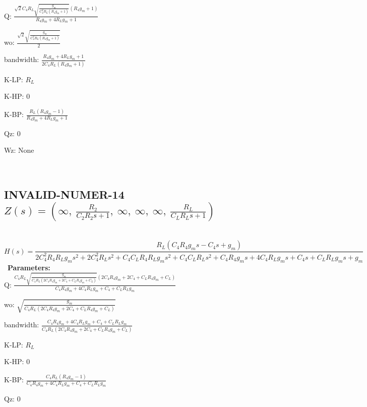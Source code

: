 \documentclass{article}
\begin{document}
Q: $\frac{\sqrt{2} C_{4} R_{L} \sqrt{\frac{g_{m}}{C_{4}^{2} R_{L} \left(R_{4} g_{m} + 1\right)}} \left(R_{4} g_{m} + 1\right)}{R_{4} g_{m} + 4 R_{L} g_{m} + 1}$\ 

wo: $\frac{\sqrt{2} \sqrt{\frac{g_{m}}{C_{4}^{2} R_{L} \left(R_{4} g_{m} + 1\right)}}}{2}$\ 

bandwidth: $\frac{R_{4} g_{m} + 4 R_{L} g_{m} + 1}{2 C_{4} R_{L} \left(R_{4} g_{m} + 1\right)}$\ 

K-LP: $R_{L}$\ 

K-HP: $0$\ 

K-BP: $\frac{R_{L} \left(R_{4} g_{m} - 1\right)}{R_{4} g_{m} + 4 R_{L} g_{m} + 1}$\ 

Qz: $0$\ 

Wz: $\text{None}$\ 

\ 

\subsection{INVALID-NUMER-14 $Z(s) = \left( \infty, \  \frac{R_{2}}{C_{2} R_{2} s + 1}, \  \infty, \  \infty, \  \infty, \  \frac{R_{L}}{C_{L} R_{L} s + 1}\right)$ } \ 
\textbf{\[H(s) = \frac{R_{L} \left(C_{4} R_{4} g_{m} s - C_{4} s + g_{m}\right)}{2 C_{4}^{2} R_{4} R_{L} g_{m} s^{2} + 2 C_{4}^{2} R_{L} s^{2} + C_{4} C_{L} R_{4} R_{L} g_{m} s^{2} + C_{4} C_{L} R_{L} s^{2} + C_{4} R_{4} g_{m} s + 4 C_{4} R_{L} g_{m} s + C_{4} s + C_{L} R_{L} g_{m} s + g_{m}}\] } \ 
\textbf{Parameters:}\\ 

Q: $\frac{C_{4} R_{L} \sqrt{\frac{g_{m}}{C_{4} R_{L} \left(2 C_{4} R_{4} g_{m} + 2 C_{4} + C_{L} R_{4} g_{m} + C_{L}\right)}} \left(2 C_{4} R_{4} g_{m} + 2 C_{4} + C_{L} R_{4} g_{m} + C_{L}\right)}{C_{4} R_{4} g_{m} + 4 C_{4} R_{L} g_{m} + C_{4} + C_{L} R_{L} g_{m}}$\ 

wo: $\sqrt{\frac{g_{m}}{C_{4} R_{L} \left(2 C_{4} R_{4} g_{m} + 2 C_{4} + C_{L} R_{4} g_{m} + C_{L}\right)}}$\ 

bandwidth: $\frac{C_{4} R_{4} g_{m} + 4 C_{4} R_{L} g_{m} + C_{4} + C_{L} R_{L} g_{m}}{C_{4} R_{L} \left(2 C_{4} R_{4} g_{m} + 2 C_{4} + C_{L} R_{4} g_{m} + C_{L}\right)}$\ 

K-LP: $R_{L}$\ 

K-HP: $0$\ 

K-BP: $\frac{C_{4} R_{L} \left(R_{4} g_{m} - 1\right)}{C_{4} R_{4} g_{m} + 4 C_{4} R_{L} g_{m} + C_{4} + C_{L} R_{L} g_{m}}$\ 

Qz: $0$\ 
\end{document}
